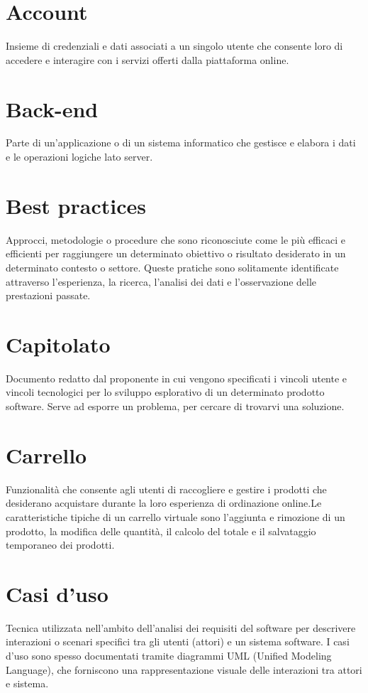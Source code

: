 \section{Account}
Insieme di credenziali e dati associati a un singolo utente che consente loro di accedere e interagire con i servizi offerti dalla piattaforma online.

\section{Back-end}
Parte di un'applicazione o di un sistema informatico che gestisce e elabora i dati e le operazioni logiche lato server.

\section{Best practices}
Approcci, metodologie o procedure che sono riconosciute come le più efficaci e efficienti per raggiungere un determinato obiettivo o risultato desiderato in un determinato contesto o settore. Queste pratiche sono solitamente identificate attraverso l'esperienza, la ricerca, l'analisi dei dati e l'osservazione delle prestazioni passate.

\section{Capitolato}
Documento redatto dal proponente in cui vengono specificati i vincoli utente e vincoli tecnologici per lo sviluppo esplorativo di un determinato prodotto software. Serve ad esporre un problema, per cercare di trovarvi una soluzione.

\section{Carrello}
Funzionalità che consente agli utenti di raccogliere e gestire i prodotti che desiderano acquistare durante la loro esperienza di ordinazione online.Le caratteristiche tipiche di un carrello virtuale sono l'aggiunta e rimozione di un prodotto, la modifica delle quantità, il calcolo del totale e il salvataggio temporaneo dei prodotti.

\section{Casi d’uso}
Tecnica utilizzata nell'ambito dell'analisi dei requisiti del software per descrivere interazioni o scenari specifici tra gli utenti (attori) e un sistema software. I casi d'uso sono spesso documentati tramite diagrammi UML (Unified Modeling Language), che forniscono una rappresentazione visuale delle interazioni tra attori e sistema.


